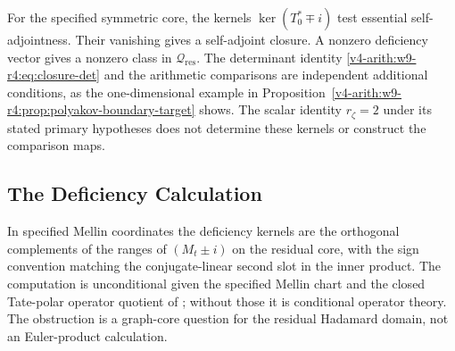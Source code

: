 \begin{remark}
\label{v4-arith:w9-r4:rem:smartest-next-calculation}
For the specified symmetric core, the kernels
$\ker(T_0^*\mp i)$ test essential self-adjointness. Their vanishing
gives a self-adjoint closure. A nonzero deficiency vector gives
a nonzero class in $\mathcal Q_{\mathrm{res}}$.
The determinant identity \eqref{v4-arith:w9-r4:eq:closure-det}
and the arithmetic comparisons are independent additional conditions,
as the one-dimensional example in
Proposition~\ref{v4-arith:w9-r4:prop:polyakov-boundary-target} shows.
The scalar identity $r_\zeta=2$ under its stated primary hypotheses
does not determine these kernels or construct the comparison maps.
\end{remark}

\subsection{The Deficiency Calculation}
\label{v4-arith:w9-r4:pdnf:deficiency-calculation}

In specified Mellin coordinates the deficiency kernels are the orthogonal
complements of the ranges of \((M_t \pm i)\) on the residual core,
with the sign convention matching the conjugate-linear second slot in
the inner product. The computation is unconditional given the specified
Mellin chart and the closed Tate-polar operator quotient of
; without those
it is conditional operator theory. The obstruction is a graph-core
question for the residual Hadamard domain, not an Euler-product
calculation.

